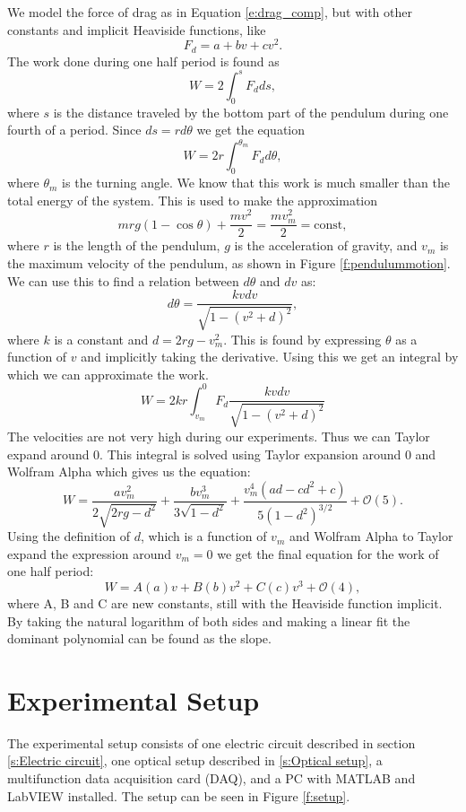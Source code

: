 \documentclass[11pt, a4paper]{article}
\begin{document}
We model the force of drag as in Equation \ref{e:drag_comp}, but with other constants and implicit Heaviside functions, like
\[
	F_d = a + bv + cv^2.
\]
The work done during one half period is found as
\[
	W = 2\int_0^s{F_d ds},
\]
where $s$ is the distance traveled by the bottom part of the pendulum during one fourth of a period.
Since $ds = rd\theta$ we get the equation
\[
	W = 2r\int_0^{\theta_m}{F_d d\theta},
\]
where $\theta_m$ is the turning angle.
We know that this work is much smaller than the total energy of the system. This is used to make the approximation 
\[
	mrg(1-\cos{\theta}) + \frac{mv^2}{2} = \frac{mv_m^2}{2} = \text{const},
\]
where $r$ is the length of the pendulum, $g$ is the acceleration of gravity, and $v_m$ is the maximum velocity of the pendulum, as shown in Figure \ref{f:pendulummotion}.
We can use this to find a relation between $d\theta$ and $dv$ as:
\[
	d\theta = \frac{kvdv}{\sqrt{1-(v^2+d)^2}},
\]
where $k$ is a constant and $d = 2rg - v_{m}^{2}$.
This is found by expressing $\theta$ as a function of $v$ and implicitly taking the derivative.
Using this we get an integral by which we can approximate the work.
\[
	W = 2kr\int_{v_m}^0 F_d \frac{kvdv}{\sqrt{1-(v^2+d)^2}}
\]
The velocities are not very high during our experiments. Thus we can Taylor expand around 0.
This integral is solved using Taylor expansion around 0 and Wolfram Alpha which gives us the equation:
\[
	W = \frac{av_{m}^{2}}{2\sqrt{2rg-d^2}} + \frac{bv_{m}^{3}}{3\sqrt{1-d^2}} + \frac{v_{m}^{4} (ad-cd^2+c)}{5(1-d^2)^{3/2}} + \mathcal{O}(5).
\]
Using the definition of $d$, which is a function of $v_m$ and Wolfram Alpha to Taylor expand the expression around $v_m=0$ we get the final equation for the work of one half period:
\begin{equation}
	W = A(a)v + B(b)v^2 + C(c)v^3 +  \mathcal{O}(4),
	\label{e:W}
\end{equation}
where A, B and C are new constants, still with the Heaviside function implicit. By taking the natural logarithm of both sides and making a linear fit the dominant polynomial can be found as the slope. 




\section{Experimental Setup}
The experimental setup consists of one electric circuit described in section 
\ref{s:Electric circuit}, one optical setup described in \ref{s:Optical setup}, a multifunction data acquisition card (DAQ), and 
a PC with MATLAB and LabVIEW installed. 
The setup can be seen in Figure \ref{f:setup}. 
\end{document}
